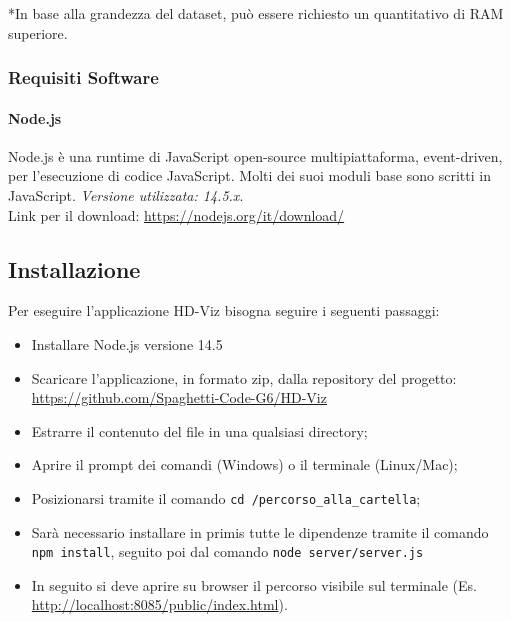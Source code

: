 \documentclass[../manuale_sviluppatore.tex]{subfiles}
\begin{document}
*In base alla grandezza del dataset, può essere richiesto un quantitativo di RAM superiore.

\subsubsection{Requisiti Software}
    \label{subsub:req_s}
\paragraph{Node.js}
    \label{par:node}
Node.js è una runtime di JavaScript open-source multipiattaforma, event-driven, per l’esecuzione di codice JavaScript. Molti dei suoi moduli base sono scritti in JavaScript. 
\emph{Versione utilizzata: 14.5.x}.\\
Link per il download: \url{https://nodejs.org/it/download/}

\subsection{Installazione}
    \label{sub:inst}

Per eseguire l’applicazione HD-Viz bisogna seguire i seguenti passaggi:
\begin{itemize}
\item Installare Node.js versione 14.5
\item Scaricare l’applicazione, in formato zip, dalla repository del progetto: \url{https://github.com/Spaghetti-Code-G6/HD-Viz}
\item Estrarre il contenuto del file in una qualsiasi directory; 
\item Aprire il prompt dei comandi (Windows) o il terminale (Linux/Mac); 
\item Posizionarsi tramite il comando \verb|cd /percorso_alla_cartella|;
\item Sarà necessario installare in primis tutte le dipendenze tramite il comando \verb|npm install|, seguito poi dal comando \verb|node server/server.js|
\item In seguito si deve aprire su browser il percorso visibile sul terminale (Es. \url{http://localhost:8085/public/index.html}).
\end{itemize}
\end{document}
